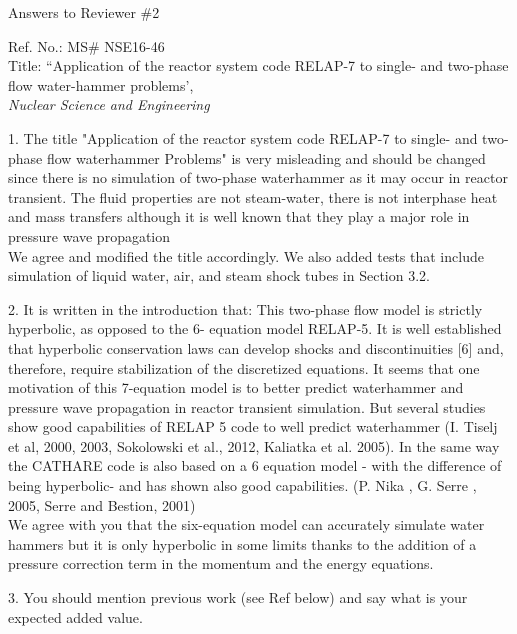 \documentclass{article}
\begin{document}
\begin{center}
{ \Large Answers to Reviewer \#2}
\end{center}

\bigskip

\noindent Ref. No.: MS\# NSE16-46\\
Title: ``Application of the reactor system code RELAP-7 to single- and two-phase flow water-hammer problems', \\
{\it Nuclear Science and Engineering}\\

\bigskip
\bigskip

{\color{blue}
1. The title "Application of the reactor system code RELAP-7 to single- and two-phase flow waterhammer Problems" is very misleading and should be changed since there is no simulation of two-phase waterhammer as it may occur in reactor transient. The fluid properties are not steam-water, there is not interphase heat and mass transfers although it is well known that they play a major role in pressure wave propagation
\\}
We agree and modified the title accordingly. We also added tests that include simulation of liquid water, air, and steam shock tubes in Section 3.2. 
\bigskip

{\color{blue}
2. It is written in the introduction that:
This two-phase flow model is strictly hyperbolic, as opposed to the 6- equation model RELAP-5. It is well established that hyperbolic conservation laws can develop shocks and discontinuities [6] and, therefore, require stabilization of the discretized equations.
It seems that one motivation of this 7-equation model is to better predict waterhammer and pressure wave propagation in reactor transient simulation. But several studies show good capabilities of RELAP 5 code to well predict waterhammer (I. Tiselj et al, 2000, 2003, Sokolowski et al., 2012, Kaliatka et al. 2005). In the same way the CATHARE code is also based on a 6 equation model - with the difference of being hyperbolic- and has shown also good capabilities. (P. Nika , G. Serre , 2005, Serre and Bestion, 2001) \\
}
We agree with you that the six-equation model can accurately simulate water hammers but it is only hyperbolic in some limits thanks to the addition of a pressure correction term in the momentum and the energy equations.
\bigskip

{\color{blue}
3. You should mention previous work (see Ref below) and say what is your expected added value. \\
}
\end{document}
